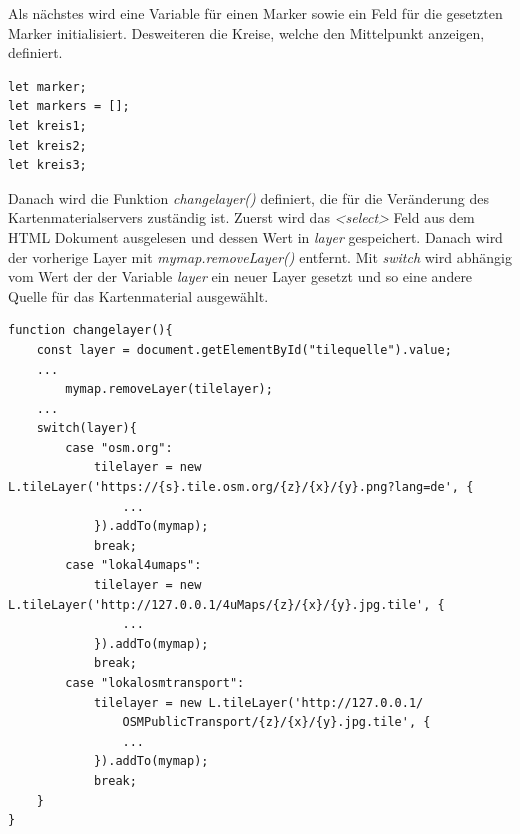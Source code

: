 \documentclass[a4paper, 12pt]{scrreprt}
\begin{document}
Als nächstes wird eine Variable für einen Marker sowie ein Feld für die gesetzten Marker initialisiert.
Desweiteren die Kreise, welche den Mittelpunkt anzeigen, definiert.
\begin{lstlisting}
let marker;
let markers = [];
let kreis1;
let kreis2;
let kreis3;
\end{lstlisting}
Danach wird die Funktion \textit{changelayer()} definiert, die für die Veränderung des Kartenmaterialservers zuständig ist.
Zuerst wird das \textit{<select>} Feld aus dem HTML Dokument ausgelesen und dessen Wert in \textit{layer} gespeichert.
Danach wird der vorherige Layer mit \textit{mymap.removeLayer()} entfernt.
Mit \textit{switch} wird abhängig vom Wert der der Variable \textit{layer} ein neuer Layer gesetzt und so eine andere Quelle für das Kartenmaterial ausgewählt.
\begin{lstlisting}
function changelayer(){
	const layer = document.getElementById("tilequelle").value;
	...
		mymap.removeLayer(tilelayer);
	...
	switch(layer){
		case "osm.org":
			tilelayer = new L.tileLayer('https://{s}.tile.osm.org/{z}/{x}/{y}.png?lang=de', {
				...
			}).addTo(mymap);
			break;
		case "lokal4umaps":
			tilelayer = new L.tileLayer('http://127.0.0.1/4uMaps/{z}/{x}/{y}.jpg.tile', {
				...
			}).addTo(mymap);
			break;
		case "lokalosmtransport":
			tilelayer = new L.tileLayer('http://127.0.0.1/
				OSMPublicTransport/{z}/{x}/{y}.jpg.tile', {
				...
			}).addTo(mymap);
			break;
	}
}
\end{lstlisting}
\end{document}
